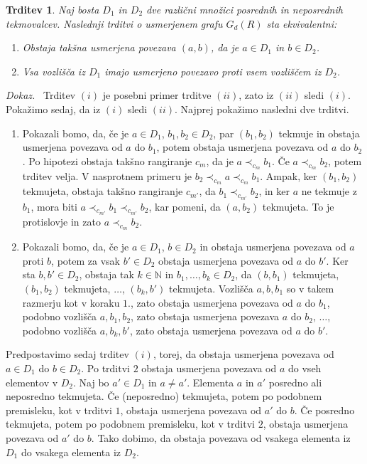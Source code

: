 \documentclass[a4paper, 12pt]{book}
\newtheorem{trditev}{Trditev}[chapter]
\newenvironment{dokaz}{\emph{Dokaz.}\ }{\hspace{\fill}{$\Box$}}
\begin{document}
\begin{trditev}
\label{trditev_ekvivalenc_mnozic_posrednih_tekmovalcev}
    Naj bosta $D_1$ in $D_2$ dve različni množici posrednih in neposrednih tekmovalcev. Naslednji trditvi o usmerjenem grafu $G_d(R)$ sta ekvivalentni:
    \begin{enumerate}[label=(\roman*)]
        \item Obstaja takšna usmerjena povezava $(a, b)$, da je $a \in D_1$ in $b \in D_2$.
        \item Vsa vozlišča iz $D_1$ imajo usmerjeno povezavo proti vsem vozliščem iz $D_2$.
    \end{enumerate}
\end{trditev}
\begin{dokaz}
    Trditev $(i)$ je posebni primer trditve $(ii)$, zato iz $(ii)$ sledi $(i)$. Pokažimo sedaj, da iz $(i)$ sledi $(ii)$. Najprej pokažimo nasledni dve trditvi.

    \begin{enumerate}
        \item Pokazali bomo, da, če je $a \in D_1$, $b_1, b_2 \in D_2$, par $(b_1, b_2)$ tekmuje in obstaja usmerjena povezava od $a$ do $b_1$, potem obstaja usmerjena povezava od $a$ do $b_2$. Po hipotezi obstaja takšno rangiranje $c_m$, da je $a \prec_{c_m} b_1$. Če $a \prec_{c_m} b_2$, potem trditev velja. V nasprotnem primeru je $b_2 \prec_{c_m} a \prec_{c_m} b_1$. Ampak, ker $(b_1, b_2)$ tekmujeta, obstaja takšno rangiranje $c_{m'}$, da $b_1 \prec_{c_{m'}} b_2$, in ker $a$ ne tekmuje z $b_1$, mora biti $a \prec_{c_{m'}} b_1 \prec_{c_{m'}} b_2$, kar pomeni, da $(a, b_2)$ tekmujeta. To je protislovje in zato $a \prec_{c_m} b_2$.
        \item Pokazali bomo, da, če je $a \in D_1$, $b \in D_2$ in obstaja usmerjena povezava od $a$ proti $b$, potem za vsak $b' \in D_2$ obstaja usmerjena povezava od $a$ do $b'$. Ker sta $b, b' \in D_2$, obstaja tak $k \in \mathbb{N}$ in $b_1, \dots, b_k \in D_2$, da $(b, b_1)$ tekmujeta, $(b_1, b_2)$ tekmujeta, $\dots$, $(b_k, b')$ tekmujeta. Vozlišča $a, b, b_1$ so v takem razmerju kot v koraku $1.$, zato obstaja usmerjena povezava od $a$ do $b_1$, podobno vozlišča $a, b_1, b_2$, zato obstaja usmerjena povezava $a$ do $b_2$, $\dots$, podobno vozlišča $a, b_k, b'$, zato obstaja usmerjena povezava od $a$ do $b'$.
    \end{enumerate}
        
    Predpostavimo sedaj trditev $(i)$, torej, da obstaja usmerjena povezava od $a \in D_1$ do $b \in D_2$. Po trditvi $2$ obstaja usmerjena povezava od $a$ do vseh elementov v $D_2$. 
    Naj bo $a' \in D_1$ in $a \neq a'$. Elementa $a$ in $a'$ posredno ali neposredno tekmujeta. Če (neposredno) tekmujeta, potem po podobnem premisleku, kot v trditvi $1$, obstaja usmerjena povezava od $a'$ do $b$. Če posredno tekmujeta, potem po podobnem premisleku, kot v trditvi $2$, obstaja usmerjena povezava od $a'$ do $b$. Tako dobimo, da obstaja povezava od vsakega elementa iz $D_1$ do vsakega elementa iz $D_2$.
\end{dokaz}
\end{document}
